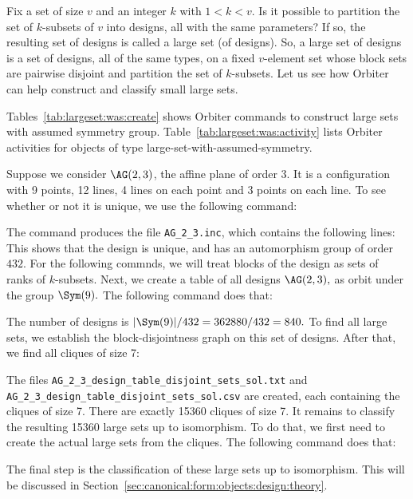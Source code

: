 Fix a set of size $v$ and an integer $k$ with $1 <k < v.$ Is it possible to partition the set of 
$k$-subsets of $v$ into designs, all with the same parameters? 
If so, the resulting set of designs is called a large set (of designs).
So, a large set of designs is a set of designs, all of the same types, 
on a fixed $v$-element set 
whose block sets are pairwise disjoint and partition the set of 
$k$-subsets. 
Let us see how Orbiter can help construct and classify small large sets.


Tables~\ref{tab:largeset:was:create} shows Orbiter 
commands to construct large sets with assumed symmetry group.
Table~\ref{tab:largeset:was:activity} lists Orbiter activities for 
objects of type large-set-with-assumed-symmetry.

\bigskip

Suppose we consider $\AG(2,3)$, the affine plane of order 3. 
It is a configuration with 9 points, 12 lines, 4 lines on each point and 3 points on each line.
To see whether or not it is unique, we use the following command:


The command produces the file \verb'AG_2_3.inc', which contains the following lines:
This shows that the design is unique, and has an automorphism group of order $432$.
For the following commnds, we will treat blocks of the design as sets of ranks of $k$-subsets. 
Next, we create a table of all designs $\AG(2,3),$ as orbit under the group $\Sym(9).$
The following command does that:




The number of designs is $|\Sym(9)|/432 = 362880/432 = 840.$
To find all large sets, we establish the block-disjointness graph 
on this set of designs. After that, we find all cliques of size 7:


The files \verb'AG_2_3_design_table_disjoint_sets_sol.txt' 
and \verb'AG_2_3_design_table_disjoint_sets_sol.csv' 
are created, each containing the cliques of size 7. 
There are exactly 15360 cliques of size 7.
It remains to classify the resulting 15360 large sets up to isomorphism. 
To do that, we first need to create the actual large sets from the cliques.
The following command does that:


The final step is the classification of these large sets up to isomorphism. 
This will be discussed in Section~\ref{sec:canonical:form:objects:design:theory}.

